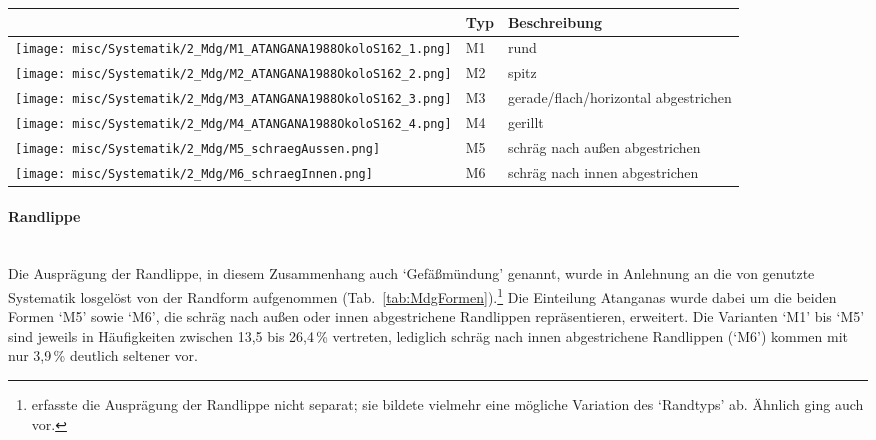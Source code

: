 \begin{table*}[!tb]
	\centering
	{\small
		\begin{tabular}{@{}m{}m{}m{}@{}}
			\toprule
			& \textbf{Typ} & \textbf{Beschreibung} \\
			\midrule
			\texttt{[image: misc/Systematik/2\_Mdg/M1\_ATANGANA1988OkoloS162\_1.png]} & M1 & rund \\
			\texttt{[image: misc/Systematik/2\_Mdg/M2\_ATANGANA1988OkoloS162\_2.png]} & M2 & spitz \\
			\texttt{[image: misc/Systematik/2\_Mdg/M3\_ATANGANA1988OkoloS162\_3.png]} & M3 & gerade/flach/horizontal abgestrichen \\
			\texttt{[image: misc/Systematik/2\_Mdg/M4\_ATANGANA1988OkoloS162\_4.png]} & M4 & gerillt \\
			\texttt{[image: misc/Systematik/2\_Mdg/M5\_schraegAussen.png]} & M5 & schräg nach außen abgestrichen \\
			\texttt{[image: misc/Systematik/2\_Mdg/M6\_schraegInnen.png]} & M6 & schräg nach innen abgestrichen \\
			\bottomrule
	\end{tabular} }
	\caption{Keramik: Randlippe \parencite[erweitert nach][162f Tab.~24]{Atangana.1988}.}
	\label{tab:MdgFormen}
\end{table*}

\clearpage\paragraph{Randlippe}
$\;$ \\
Die Ausprägung der Randlippe, in diesem Zusammenhang auch \enquote*{Gefäßmündung} genannt, wurde in Anlehnung an die von \textcite[162f Tab.~24]{Atangana.1988} genutzte Systematik losgelöst von der Randform aufgenommen (Tab.~\ref{tab:MdgFormen}).\footnote{\textcite[48]{Wotzka.1995} erfasste die Ausprägung der Randlippe nicht separat; sie bildete vielmehr eine mögliche Variation des \enquote*{Randtyps} ab. Ähnlich ging auch \textcite[110]{Jesse.2003} vor.} Die Einteilung Atanganas wurde dabei um die beiden Formen \enquote*{M5} sowie \enquote*{M6}, die schräg nach außen oder innen abgestrichene Randlippen repräsentieren, erweitert. Die Varianten \enquote*{M1} bis \enquote*{M5} sind jeweils in Häufigkeiten zwischen 13,5 bis 26,4\,\% vertreten, lediglich schräg nach innen abgestrichene Randlippen (\enquote*{M6}) kommen mit nur 3,9\,\% deutlich seltener vor.

